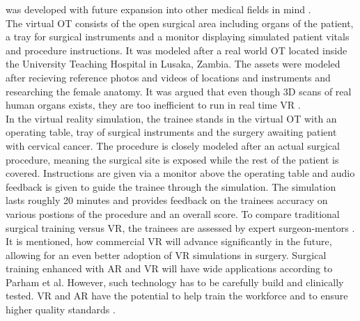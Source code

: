 was developed with future expansion into other medical fields in mind \cite{Parham.2019}.
\\ The virtual OT consists of the open surgical area including organs of the patient, a tray
for surgical instruments and a monitor displaying simulated patient vitals and procedure
instructions. It was modeled after a real world OT located inside the University Teaching
Hospital in Lusaka, Zambia. The assets were modeled after recieving reference photos
and videos of locations and instruments and researching the female anatomy. It was
argued that even though 3D scans of real human organs exists, they are too inefficient
to run in real time VR \cite{Parham.2019}.
\\ In the virtual reality simulation, the trainee stands in the virtual OT with an operating
table, tray of surgical instruments and the surgery awaiting patient with cervical cancer.
The procedure is closely modeled after an actual surgical procedure, meaning the surgical
site is exposed while the rest of the patient is covered. Instructions are given via a
monitor above the operating table and audio feedback is given to guide the trainee
through the simulation. The simulation lasts roughly 20 minutes and provides feedback
on the trainees accuracy on various postions of the procedure and an overall score. To
compare traditional surgical training versus VR, the trainees are assessed by expert
surgeon-mentors \cite{Parham.2019}.
\\ It is mentioned, how commercial VR will advance significantly in the future, allowing
for an even better adoption of VR simulations in surgery. Surgical training enhanced
with AR and VR will have wide applications according to Parham et
al. However, such technology has to be carefully build and clinically tested. VR and
AR have the potential to help train the workforce and to ensure higher quality standards
\cite{Parham.2019}.

